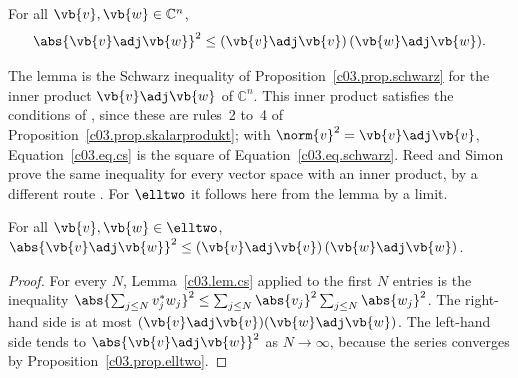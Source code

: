 \begin{fundament}[id=c03.f1,
    titel={The Cauchy-Schwarz inequality},
    wozu={Block~\ref{c03.v1} shows with a rough estimate that the inner product on $\elltwo$
      is finite. Here is the sharp bound: the modulus of the inner product is at most the
      product of the lengths.},
    voraussetzung={Proposition~\ref{c03.prop.skalarprodukt}, the Schwarz inequality
      (Proposition~\ref{c03.prop.schwarz}) and block~\ref{c03.v1}. Neither the core nor the
      deeper blocks need this block.},
    zurueck={For two vectors, $\abs{\vb{v}\adj\vb{w}}^2$ is never larger than
      $(\vb{v}\adj\vb{v})(\vb{w}\adj\vb{w})$, in $\mathbb{C}^n$ as in $\elltwo$.}]
  \begin{lemma}\label{c03.lem.cs}
    For all $\vb{v}, \vb{w} \in \mathbb{C}^n$,
    \begin{equation}\label{c03.eq.cs}
      \abs{\vb{v}\adj\vb{w}}^2 \leq (\vb{v}\adj\vb{v})\,(\vb{w}\adj\vb{w}) .
    \end{equation}
  \end{lemma}

  The lemma is the Schwarz inequality of Proposition~\ref{c03.prop.schwarz} for the inner
  product $\vb{v}\adj\vb{w}$ of $\mathbb{C}^n$. This inner product satisfies the conditions of
  , since these are rules~2 to~4 of Proposition~\ref{c03.prop.skalarprodukt}; with
  $\norm{v}^2 = \vb{v}\adj\vb{v}$, Equation~\eqref{c03.eq.cs} is the square of
  Equation~\eqref{c03.eq.schwarz}. Reed and Simon prove the same inequality for every vector
  space with an inner product, by a different route . For
  $\elltwo$ it follows here from the lemma by a limit.

  \begin{proposition}\label{c03.prop.cs-elltwo}
    For all $\vb{v}, \vb{w} \in \elltwo$,
    $\abs{\vb{v}\adj\vb{w}}^2 \leq (\vb{v}\adj\vb{v})\,(\vb{w}\adj\vb{w})$.
  \end{proposition}
  \begin{proof}
    For every $N$, Lemma~\ref{c03.lem.cs} applied to the first $N$ entries is the inequality
    $\abs{\sum_{j \leq N} v_j^* w_j}^2 \leq \sum_{j \leq N} \abs{v_j}^2 \sum_{j \leq N} \abs{w_j}^2$.
    The right-hand side is at most $(\vb{v}\adj\vb{v})(\vb{w}\adj\vb{w})$. The left-hand side
    tends to $\abs{\vb{v}\adj\vb{w}}^2$ as $N \to \infty$, because the series converges by
    Proposition~\ref{c03.prop.elltwo}.
  \end{proof}
\end{fundament}

